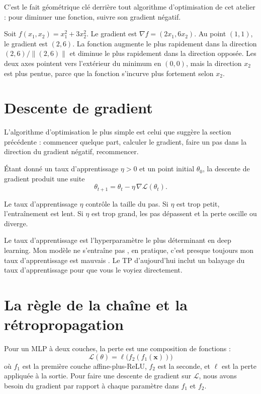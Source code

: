 C'est le fait géométrique clé derrière tout algorithme d'optimisation de cet atelier : pour diminuer une fonction, suivre son gradient négatif.

\begin{example}
Soit $f(x_1, x_2) = x_1^2 + 3 x_2^2$. Le gradient est $\nabla f = (2 x_1, 6 x_2)$. Au point $(1, 1)$, le gradient est $(2, 6)$. La fonction augmente le plus rapidement dans la direction $(2, 6)/\|(2, 6)\|$ et diminue le plus rapidement dans la direction opposée. Les deux axes pointent vers l'extérieur du minimum en $(0, 0)$, mais la direction $x_2$ est plus pentue, parce que la fonction s'incurve plus fortement selon $x_2$.
\end{example}

\section{Descente de gradient}

L'algorithme d'optimisation le plus simple est celui que suggère la section précédente : commencer quelque part, calculer le gradient, faire un pas dans la direction du gradient négatif, recommencer.

\begin{definition}
Étant donné un taux d'apprentissage $\eta > 0$ et un point initial $\theta_0$, la descente de gradient produit une suite
\[
\theta_{t+1} = \theta_t - \eta \, \nabla \mathcal{L}(\theta_t).
\]
\end{definition}

Le taux d'apprentissage $\eta$ contrôle la taille du pas. Si $\eta$ est trop petit, l'entraînement est lent. Si $\eta$ est trop grand, les pas dépassent et la perte oscille ou diverge.

\begin{warningbox}
Le taux d'apprentissage est l'hyperparamètre le plus déterminant en deep learning. \og Mon modèle ne s'entraîne pas \fg, en pratique, c'est presque toujours \og mon taux d'apprentissage est mauvais \fg. Le TP d'aujourd'hui inclut un balayage du taux d'apprentissage pour que vous le voyiez directement.
\end{warningbox}

\section{La règle de la chaîne et la rétropropagation}

Pour un MLP à deux couches, la perte est une composition de fonctions :
\[
\mathcal{L}(\theta) = \ell\bigl(f_2(f_1(\bm{x}))\bigr)
\]
où $f_1$ est la première couche affine-plus-ReLU, $f_2$ est la seconde, et $\ell$ est la perte appliquée à la sortie. Pour faire une descente de gradient sur $\mathcal{L}$, nous avons besoin du gradient par rapport à chaque paramètre dans $f_1$ et $f_2$.

